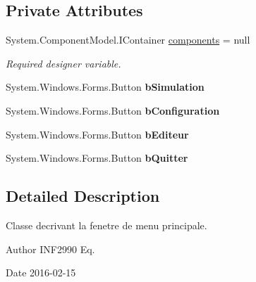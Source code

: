 \subsection*{Private Attributes}
\begin{DoxyCompactItemize}
\item 
System.\+Component\+Model.\+I\+Container \hyperlink{class_interface_graphique_1_1_menu_principale_a55dedbb7f06ab4f0c703b5a69753ab20}{components} = null
\begin{DoxyCompactList}\small\item\em Required designer variable. \end{DoxyCompactList}\item 
System.\+Windows.\+Forms.\+Button {\bfseries b\+Simulation}\hypertarget{class_interface_graphique_1_1_menu_principale_a9edc943a89554767a807a84415020111}{}\label{class_interface_graphique_1_1_menu_principale_a9edc943a89554767a807a84415020111}

\item 
System.\+Windows.\+Forms.\+Button {\bfseries b\+Configuration}\hypertarget{class_interface_graphique_1_1_menu_principale_aa4514c2ef70a8b0c5ac6bdf5c589013e}{}\label{class_interface_graphique_1_1_menu_principale_aa4514c2ef70a8b0c5ac6bdf5c589013e}

\item 
System.\+Windows.\+Forms.\+Button {\bfseries b\+Editeur}\hypertarget{class_interface_graphique_1_1_menu_principale_a1d2b5726d66e766f297fe1862db0d0f4}{}\label{class_interface_graphique_1_1_menu_principale_a1d2b5726d66e766f297fe1862db0d0f4}

\item 
System.\+Windows.\+Forms.\+Button {\bfseries b\+Quitter}\hypertarget{class_interface_graphique_1_1_menu_principale_a3f8418cb7b67c628b92a5a5ec2ce80d3}{}\label{class_interface_graphique_1_1_menu_principale_a3f8418cb7b67c628b92a5a5ec2ce80d3}

\end{DoxyCompactItemize}


\subsection{Detailed Description}
Classe decrivant la fenetre de menu principale. 

\begin{DoxyAuthor}{Author}
I\+N\+F2990 Eq. 
\end{DoxyAuthor}
\begin{DoxyDate}{Date}
2016-\/02-\/15 
\end{DoxyDate}


